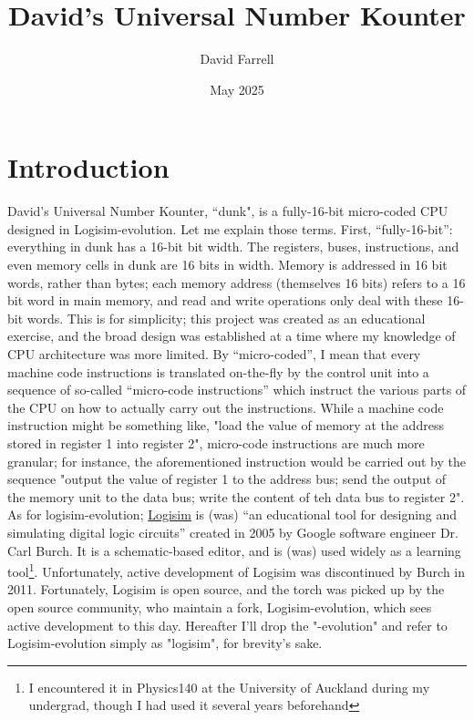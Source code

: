 \documentclass{article}
\title{David's Universal Number Kounter}
\author{David Farrell}
\date{May 2025}
\begin{document}
\maketitle

\section{Introduction}

David's Universal Number Kounter, ``dunk", is a fully-16-bit micro-coded CPU designed in Logisim-evolution. Let me explain those terms. First, ``fully-16-bit'': everything in dunk has a 16-bit bit width. The registers, buses, instructions, and even memory cells in dunk are 16 bits in width. Memory is addressed in 16 bit words, rather than bytes; each memory address (themselves 16 bits) refers to a 16 bit word in main memory, and read and write operations only deal with these 16-bit words. This is for simplicity; this project was created as an educational exercise, and the broad design was established at a time where my knowledge of CPU architecture was more limited. By ``micro-coded'', I mean that every machine code instructions is translated on-the-fly by the control unit into a sequence of so-called ``micro-code instructions'' which instruct the various parts of the CPU on how to actually carry out the instructions. While a machine code instruction might be something like, "load the value of memory at the address stored in register 1 into register 2", micro-code instructions are much more granular; for instance, the aforementioned instruction would be carried out by the sequence "output the value of register 1 to the address bus; send the output of the memory unit to the data bus; write the content of teh data bus to register 2". As for logisim-evolution; \href{https://cburch.com/logisim/docs/2.0b17/index.html}{Logisim} is (was) ``an educational tool for designing and simulating digital logic circuits'' created in 2005 by Google software engineer Dr. Carl Burch. It is a schematic-based editor, and is (was) used widely as a learning tool\footnote{I encountered it in Physics140 at the University of Auckland during my undergrad, though I had used it several years beforehand}. Unfortunately, active development of Logisim was discontinued by Burch in 2011. Fortunately, Logisim is open source, and the torch was picked up by the open source community, who maintain a fork, Logisim-evolution, which sees active development to this day. Hereafter I'll drop the "-evolution" and refer to Logisim-evolution simply as "logisim", for brevity's sake. 
\end{document}
